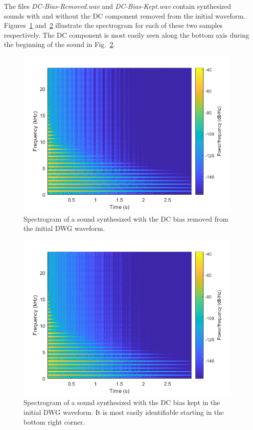 \documentclass[../main.tex]{subfiles}
\begin{document}
The files \emph{DC-Bias-Removed.wav} and \emph{DC-Bias-Kept.wav} contain synthesized sounds with and without the DC component removed from the initial waveform. Figures~\ref{fig:DCBiasRemoved} and~\ref{fig:DCBiasKept} illustrate the spectrogram for each of these two samples respectively. The DC component is most easily seen along the bottom axis during the beginning of the sound in Fig.~\ref{fig:DCBiasKept}.

\clearpage

\begin{figure}[h!]
    \centering
    \includegraphics[scale=.6]{./images/plots/DCBiasRemoved.png}
    \caption{Spectrogram of a sound synthesized with the DC bias removed from the initial DWG waveform.}
    \label{fig:DCBiasRemoved}
\end{figure}

\begin{figure}[h!]
    \centering
    \includegraphics[scale=.6]{./images/plots/DCBiasKept.png}
    \caption{Spectrogram of a sound synthesized with the DC bias kept in the initial DWG waveform. It is most easily identifiable starting in the bottom right corner.}
    \label{fig:DCBiasKept}
\end{figure}
\end{document}
